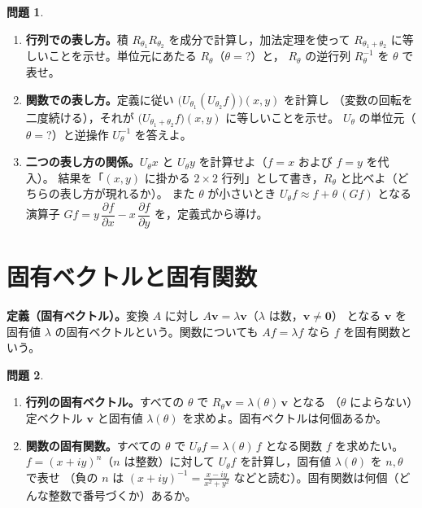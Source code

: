 \documentclass[dvipdfmx, uplatex]{jsarticle}
\theoremstyle{definition}
\newtheorem*{prob}{問題}
\begin{document}
\begin{prob}
\begin{enumerate}
\item \textbf{行列での表し方。}積 $R_{\theta_1}R_{\theta_2}$ を成分で計算し，加法定理を使って
$R_{\theta_1+\theta_2}$ に等しいことを示せ。単位元にあたる $R_\theta$（$\theta=$?）と，
$R_\theta$ の逆行列 $R_\theta^{-1}$ を $\theta$ で表せ。
\item \textbf{関数での表し方。}定義に従い $\bigl(U_{\theta_1}(U_{\theta_2}f)\bigr)(x,y)$ を計算し
（変数の回転を二度続ける），それが $\bigl(U_{\theta_1+\theta_2}f\bigr)(x,y)$ に等しいことを示せ。
$U_\theta$ の単位元（$\theta=$?）と逆操作 $U_\theta^{-1}$ を答えよ。
\item \textbf{二つの表し方の関係。}$U_\theta x$ と $U_\theta y$ を計算せよ（$f=x$ および $f=y$ を代入）。
結果を「$(x,y)$ に掛かる $2\times2$ 行列」として書き，$R_\theta$ と比べよ（どちらの表し方が現れるか）。
また $\theta$ が小さいとき $U_\theta f\approx f+\theta\,(Gf)$ となる演算子
$\boxed{Gf=y\,\dfrac{\partial f}{\partial x}-x\,\dfrac{\partial f}{\partial y}}$ を，定義式から導け。
\end{enumerate}
\end{prob}

\section{固有ベクトルと固有関数}
\noindent\textbf{定義（固有ベクトル）。}変換 $A$ に対し $A\bm v=\lambda\bm v$（$\lambda$ は数，$\bm v\neq\bm0$）
となる $\bm v$ を固有値 $\lambda$ の固有ベクトルという。関数についても $A f=\lambda f$ なら $f$ を固有関数という。

\begin{prob}
\begin{enumerate}[start=4]
\item \textbf{行列の固有ベクトル。}すべての $\theta$ で $R_\theta\bm v=\lambda(\theta)\,\bm v$ となる
（$\theta$ によらない）定ベクトル $\bm v$ と固有値 $\lambda(\theta)$ を求めよ。固有ベクトルは何個あるか。
\item \textbf{関数の固有関数。}すべての $\theta$ で $U_\theta f=\lambda(\theta)\,f$ となる関数 $f$ を求めたい。
$f=(x+iy)^n$（$n$ は整数）に対して $U_\theta f$ を計算し，固有値 $\lambda(\theta)$ を $n,\theta$ で表せ
（負の $n$ は $(x+iy)^{-1}=\tfrac{x-iy}{x^2+y^2}$ などと読む）。固有関数は何個（どんな整数で番号づくか）あるか。
\end{enumerate}
\end{prob}
\end{document}
